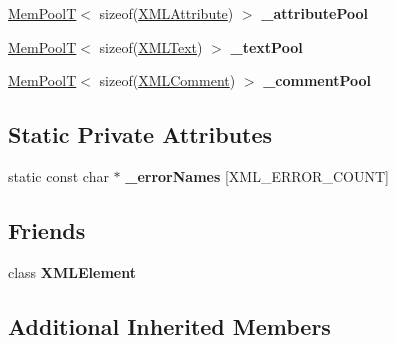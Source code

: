 \begin{DoxyCompactItemize}
\item 
\hyperlink{classtinyxml2_1_1_mem_pool_t}{Mem\+PoolT}$<$ sizeof(\hyperlink{classtinyxml2_1_1_x_m_l_attribute}{X\+M\+L\+Attribute}) $>$ {\bfseries \+\_\+attribute\+Pool}\hypertarget{classtinyxml2_1_1_x_m_l_document_a0a57ebeba23bc6cfce88f12b4a946aac}{}\label{classtinyxml2_1_1_x_m_l_document_a0a57ebeba23bc6cfce88f12b4a946aac}

\item 
\hyperlink{classtinyxml2_1_1_mem_pool_t}{Mem\+PoolT}$<$ sizeof(\hyperlink{classtinyxml2_1_1_x_m_l_text}{X\+M\+L\+Text}) $>$ {\bfseries \+\_\+text\+Pool}\hypertarget{classtinyxml2_1_1_x_m_l_document_afe8ac410aaa53cf1f2142a4c2fd958c7}{}\label{classtinyxml2_1_1_x_m_l_document_afe8ac410aaa53cf1f2142a4c2fd958c7}

\item 
\hyperlink{classtinyxml2_1_1_mem_pool_t}{Mem\+PoolT}$<$ sizeof(\hyperlink{classtinyxml2_1_1_x_m_l_comment}{X\+M\+L\+Comment}) $>$ {\bfseries \+\_\+comment\+Pool}\hypertarget{classtinyxml2_1_1_x_m_l_document_ac2e73ccbc037dee917c3163158180398}{}\label{classtinyxml2_1_1_x_m_l_document_ac2e73ccbc037dee917c3163158180398}

\end{DoxyCompactItemize}
\subsection*{Static Private Attributes}
\begin{DoxyCompactItemize}
\item 
static const char $\ast$ {\bfseries \+\_\+error\+Names} \mbox{[}X\+M\+L\+\_\+\+E\+R\+R\+O\+R\+\_\+\+C\+O\+U\+NT\mbox{]}\hypertarget{classtinyxml2_1_1_x_m_l_document_aaa8fd366adfb2c368ed7c13e471f54ae}{}\label{classtinyxml2_1_1_x_m_l_document_aaa8fd366adfb2c368ed7c13e471f54ae}

\end{DoxyCompactItemize}
\subsection*{Friends}
\begin{DoxyCompactItemize}
\item 
class {\bfseries X\+M\+L\+Element}\hypertarget{classtinyxml2_1_1_x_m_l_document_ac2fba9b6e452829dd892f7392c24e0eb}{}\label{classtinyxml2_1_1_x_m_l_document_ac2fba9b6e452829dd892f7392c24e0eb}

\end{DoxyCompactItemize}
\subsection*{Additional Inherited Members}



